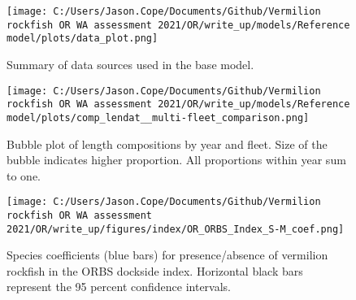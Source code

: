 \documentclass[11pt,
  english,
  a4paper,
]{article}
\begin{document}
\tagmcend\tagstructend


\begin{figure}
\centering
\texttt{[image: C:/Users/Jason.Cope/Documents/Github/Vermilion rockfish OR WA assessment 2021/OR/write\_up/models/Reference model/plots/data\_plot.png]}
\caption{Summary of data sources used in the base model.\label{fig:data-plot}}
\end{figure}

\tagmcend\tagstructend


\begin{figure}
\centering
\texttt{[image: C:/Users/Jason.Cope/Documents/Github/Vermilion rockfish OR WA assessment 2021/OR/write\_up/models/Reference model/plots/comp\_lendat\_\_multi-fleet\_comparison.png]}
\caption{Bubble plot of length compositions by year and fleet. Size of the bubble indicates higher proportion. All proportions within year sum to one.\label{fig:comm-rec-lts_bubbs}}
\end{figure}

\tagmcend\tagstructend


\begin{figure}
\centering
\texttt{[image: C:/Users/Jason.Cope/Documents/Github/Vermilion rockfish OR WA assessment 2021/OR/write\_up/figures/index/OR\_ORBS\_Index\_S-M\_coef.png]}
\caption{Species coefficients (blue bars) for presence/absence of vermilion rockfish in the ORBS dockside index. Horizontal black bars represent the 95 percent confidence intervals.\label{fig:s-m-coef}}
\end{figure}

\tagmcend\tagstructend

\end{document}
